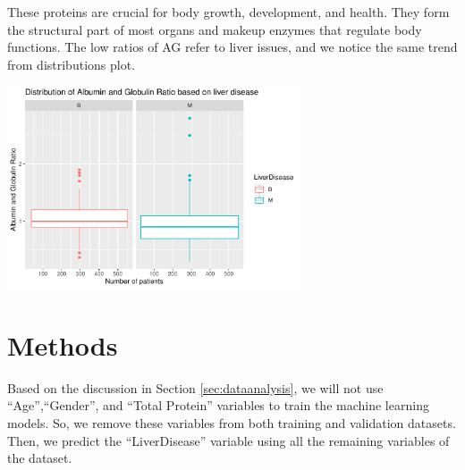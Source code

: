\documentclass[]{article}
\newenvironment{Shaded}{\begin{snugshade}}{\end{snugshade}}
\newcommand{\CommentTok}[1]{\textcolor[rgb]{0.56,0.35,0.01}{\textit{#1}}}
\newcommand{\DataTypeTok}[1]{\textcolor[rgb]{0.13,0.29,0.53}{#1}}
\newcommand{\KeywordTok}[1]{\textcolor[rgb]{0.13,0.29,0.53}{\textbf{#1}}}
\newcommand{\NormalTok}[1]{#1}
\newcommand{\OperatorTok}[1]{\textcolor[rgb]{0.81,0.36,0.00}{\textbf{#1}}}
\newcommand{\StringTok}[1]{\textcolor[rgb]{0.31,0.60,0.02}{#1}}
\begin{document}
These proteins are crucial for body growth, development, and health.
They form the structural part of most organs and makeup enzymes that
regulate body functions. The low ratios of AG refer to liver issues, and
we notice the same trend from distributions plot.

\begin{Shaded}
\end{Shaded}

\begin{center}
\includegraphics[width=0.65\textwidth]{LiverDisease_files/figure-latex/unnamed-chunk-23-1.pdf}
\end{center}

\section{Methods}
\label{sec:methods}

Based on the discussion in Section \ref{sec:dataanalysis}, we will not
use ``Age'',``Gender'', and ``Total Protein'' variables to train the
machine learning models. So, we remove these variables from both
training and validation datasets. Then, we predict the ``LiverDisease''
variable using all the remaining variables of the dataset.
\end{document}

